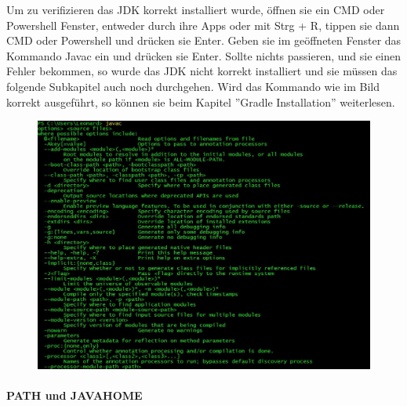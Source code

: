 \documentclass{book}
\begin{document}
Um zu verifizieren das JDK korrekt installiert wurde, öffnen sie ein CMD oder Powershell Fenster, entweder durch ihre Apps oder mit Strg + R, tippen sie dann CMD oder Powershell und drücken sie Enter. Geben sie im geöffneten Fenster das Kommando Javac ein und drücken sie Enter. Sollte nichts passieren, und sie einen Fehler bekommen, so wurde das JDK nicht korrekt installiert und sie müssen das folgende Subkapitel auch noch durchgehen. Wird das Kommando wie im Bild korrekt ausgeführt, so können sie beim Kapitel ''Gradle Installation'' weiterlesen. 

\begin{figure}[h!]
\centering
\includegraphics[width=\linewidth]{JavacWindows.JPG}
\end{figure}


\newpage
\paragraph{PATH und JAVA\textunderscore HOME}
\end{document}
